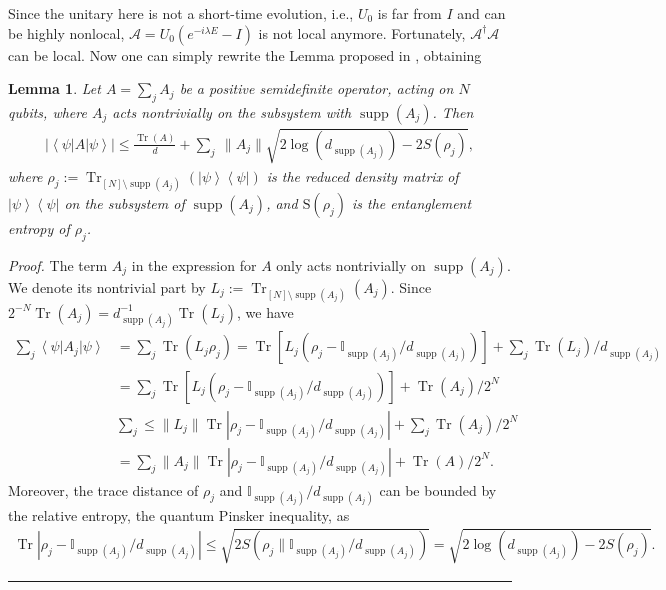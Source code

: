 \documentclass[12pt]{article}
\newtheorem{lemma}{Lemma}
\newenvironment{proof}{\par\noindent\textit{Proof.}}{\hfill\rule{0.6em}{0.6em}\par}
\newcommand{\ket}[1]{\left|#1\right\rangle}
\newcommand{\bra}[1]{\left\langle #1\right|}
\newcommand{\Tr}{\operatorname{Tr}}
\DeclareMathOperator{\support}{supp}
\begin{document}
Since the unitary here is not a short-time evolution, i.e., $U_0$ is far from $I$ and can be highly nonlocal, $\mathscr{A}=U_0(e^{-i\lambda E}-I)$ is not local anymore. Fortunately, $\mathscr{A}^\dagger \mathscr{A}$ can be local.  Now one can simply rewrite the Lemma proposed in \cite{Zhao_2025NP}, obtaining

\begin{lemma} \cite{Zhao_2025NP} \label{lemma1}
         Let $A=\sum_j A_j$ be a positive semidefinite operator, acting on $N$ qubits, where $A_j$ acts nontrivially on the subsystem with $\support(A_j)$. Then
\begin{align}
  | \bra{\psi}A \ket{\psi}|\le \frac{\Tr(A)}{d}+    \sum_{j} ~\| A_j\| \sqrt{2\log(d_{\support(A_{j})})-2S(\rho_{j})},
\end{align}
where $\rho_{j}:=\Tr_{[N]\setminus \support(A_j)}(\ket{\psi}\bra{\psi})$ is the reduced density matrix of $\ket{\psi}\bra{\psi}$ on the subsystem of $\support(A_j)$, and $\text{S}(\rho_{j})$ is the entanglement entropy of $\rho_{j}$.   
\end{lemma}

\begin{proof}
The term $A_j$ in the expression for $A$ only acts nontrivially on $\support(A_j)$. We denote its nontrivial part by $L_{j}:=\Tr_{[N]\setminus \support(A_j)} (A_j)$. Since $2^{-N}\Tr(A_j)=d_{\support(A_j)}^{-1}\Tr(L_{j})$, we have
\begin{equation}
\begin{aligned}
\sum_j\bra{\psi}A_j \ket{\psi}&=\sum_j\Tr(L_{j}\rho_{j})=\Tr[L_{j}(\rho_{j}- \mathbb{I}_{\support(A_j)}/d_{\support(A_j)})]+\sum_j\Tr(L_{j})/d_{\support(A_j)}\\
&= \sum_j\Tr[L_{j}(\rho_{j}- \mathbb{I}_{\support(A_j)}/d_{\support(A_j)})]+\Tr(A_j)/2^N\\
&\sum_j\leq \|L_{j}\|\Tr|\rho_{j}- \mathbb{I}_{\support(A_j)}/d_{\support(A_j)}|+\sum_j\Tr(A_j)/2^N\\
&=\sum_j \|A_j\| \Tr|\rho_{j}- \mathbb{I}_{\support(A_j)}/d_{\support(A_j)}|+\Tr(A)/2^N.
\end{aligned}
\end{equation}
Moreover, the trace distance of $\rho_{j}$ and $\mathbb{I}_{\support(A_j)}/d_{\support(A_j)}$ can be bounded by the relative entropy, the quantum Pinsker inequality, as
\begin{align}
    \Tr|\rho_{j}- \mathbb{I}_{\support(A_j)}/d_{\support(A_j)}| \le \sqrt{2S(\rho_{j}\|\mathbb{I}_{\support(A_j)}/d_{\support(A_j)}) }=
    \sqrt{2\log(d_{\support(A_j)})-2S(\rho_{j})}.
\end{align}
\end{proof}
\end{document}
